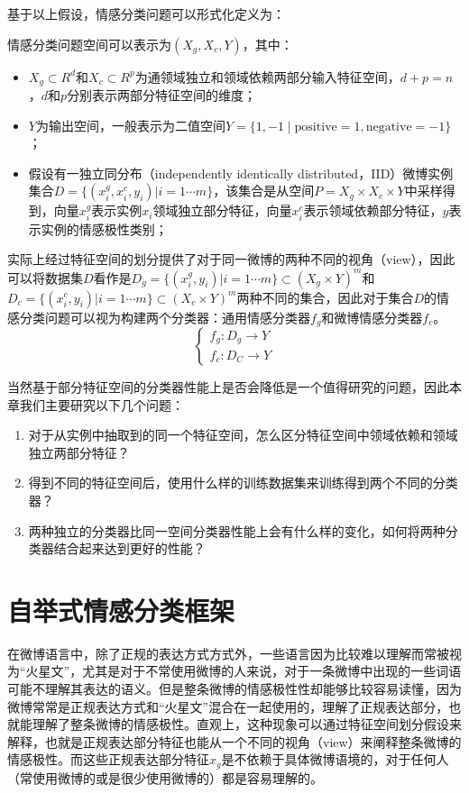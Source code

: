 基于以上假设，情感分类问题可以形式化定义为：
\begin{definition}[基于特征空间划分的情感分类]
情感分类问题空间可以表示为$(X_{g},X_{c},Y)$，其中：
\begin{itemize}
\item $ X_{g}\subset R^d$和$ X_{c}\subset R^p$为通领域独立和领域依赖两部分输入特征空间，$d+p=n$，$ d $和$ p $分别表示两部分特征空间的维度；
\item $Y$为输出空间，一般表示为二值空间$ Y=\lbrace 1,-1\mid \mathrm{positive}=1,\mathrm{negative}=-1 \rbrace$；
\item 假设有一独立同分布（independently identically distributed，IID）微博实例集合$D=\{(x_i^g,x_i^c,y_i)|i=1\cdots m\}$，该集合是从空间$P=X_g \times X_c \times Y$中采样得到，向量$x_i^g$表示实例$ x_i $领域独立部分特征，向量$x_i^c$表示领域依赖部分特征，$y$表示实例的情感极性类别；
\end{itemize}
实际上经过特征空间的划分提供了对于同一微博的两种不同的视角（view），因此可以将数据集$D$看作是$D_g=\{(x_i^g,y_i)|i=1\cdots m\} \subset (X_g \times Y)^m$和$D_c=\{(x_i^c,y_i)|i=1\cdots m\} \subset (X_c \times Y)^m$两种不同的集合，因此对于集合$D$的情感分类问题可以视为构建两个分类器：通用情感分类器$ f_g $和微博情感分类器$ f_c $。
\begin{equation}
\begin{cases}
f_g:D_g \rightarrow Y\\
f_c:D_C \rightarrow Y
\end{cases}
\end{equation}
\end{definition}

当然基于部分特征空间的分类器性能上是否会降低是一个值得研究的问题，因此本章我们主要研究以下几个问题：
\begin{enumerate}
\item 对于从实例中抽取到的同一个特征空间，怎么区分特征空间中领域依赖和领域独立两部分特征？
\item 得到不同的特征空间后，使用什么样的训练数据集来训练得到两个不同的分类器？
\item 两种独立的分类器比同一空间分类器性能上会有什么样的变化，如何将两种分类器结合起来达到更好的性能？
\end{enumerate}

\section{自举式情感分类框架}
\label{ch4_frame}
在微博语言中，除了正规的表达方式方式外，一些语言因为比较难以理解而常被视为“火星文”，尤其是对于不常使用微博的人来说，对于一条微博中出现的一些词语可能不理解其表达的语义。但是整条微博的情感极性性却能够比较容易读懂，因为微博常常是正规表达方式和“火星文”混合在一起使用的，理解了正规表达部分，也就能理解了整条微博的情感极性。直观上，这种现象可以通过特征空间划分假设来解释，也就是正规表达部分特征也能从一个不同的视角（view）来阐释整条微博的情感极性。而这些正规表达部分特征$ x_{g} $是不依赖于具体微博语境的，对于任何人（常使用微博的或是很少使用微博的）都是容易理解的。

